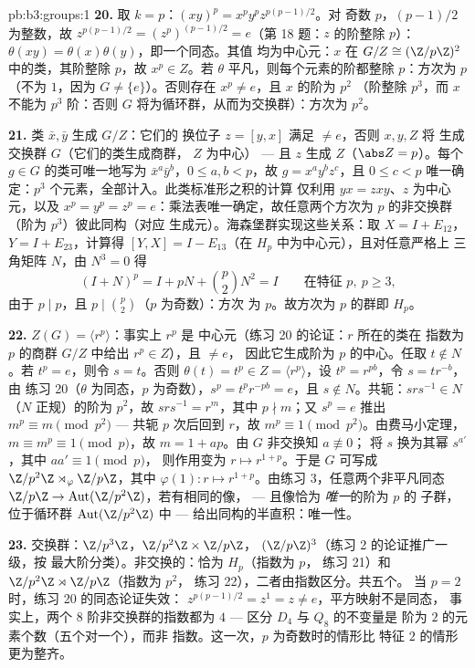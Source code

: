 \begin{solution}{pb:b3:groups:1}
\textbf{20.} 取 $k = p$：$(xy)^p = x^py^pz^{p(p-1)/2}$。对
奇数 $p$，$(p-1)/2$ 为整数，故 $z^{p(p-1)/2} =
(z^p)^{(p-1)/2} = e$（第 18 题：$z$ 的阶整除 $p$）：
$\theta(xy) = \theta(x)\theta(y)$，即一个同态。其值
均为中心元：$x$ 在 $G/Z \cong (\Z/p\Z)^2$ 中的类，其阶整除
$p$，故 $x^p \in Z$。若 $\theta$ 平凡，则每个元素的阶都整除
$p$：方次为 $p$（不为 $1$，因为 $G \neq
\{e\}$）。否则存在 $x^p \neq e$，且 $x$ 的阶为 $p^2$
（阶整除 $p^3$，而 $x$ 不能为 $p^3$ 阶：否则 $G$
将为循环群，从而为交换群）：方次为 $p^2$。

\textbf{21.} 类 $\bar x, \bar y$ 生成 $G/Z$：它们的
换位子 $z = [y, x]$ 满足 $\neq e$，否则 $x, y, Z$ 将
生成交换群 $G$（它们的类生成商群，
$Z$ 为中心） --- 且 $z$ 生成 $Z$（$\abs Z = p$）。每个
$g \in G$ 的类可唯一地写为 $\bar x^a\bar y^b$，$0 \leq a, b <
p$，故 $g = x^ay^bz^c$，且 $0 \leq c < p$ 唯一确定：$p^3$
个元素，全部计入。此类标准形之积的计算
仅利用 $yx = zxy$、$z$ 为中心元，以及 $x^p = y^p =
z^p = e$：乘法表唯一确定，故任意两个方次为 $p$
的非交换群（阶为 $p^3$）彼此同构（对应
生成元）。海森堡群实现这些关系：取
$X = I + E_{12}$，$Y = I + E_{23}$，计算得 $[Y, X] = I -
E_{13}$（在 $H_p$ 中为中心元），且对任意严格上
三角矩阵 $N$，由 $N^3 = 0$ 得
\[
(I + N)^p = I + pN + \binom p2N^2 = I
\qquad\text{在特征 } p,\ p \geq 3,
\]
由于 $p \mid p$，且 $p \mid \binom p2$（$p$ 为奇数）：方次
为 $p$。故方次为 $p$ 的群即 $H_p$。

\textbf{22.} $Z(G) = \langle r^p\rangle$：事实上 $r^p$ 是
中心元（练习 20 的论证：$r$ 所在的类在
指数为 $p$ 的商群 $G/Z$ 中给出 $r^p \in Z$），且 $\neq e$，
因此它生成阶为 $p$ 的中心。任取 $t \notin N$。若
$t^p = e$，则令 $s = t$。否则 $\theta(t) = t^p \in Z =
\langle r^p\rangle$，设 $t^p = r^{pb}$，令 $s = tr^{-b}$，由
练习 20（$\theta$ 为同态，$p$ 为奇数），$s^p =
t^pr^{-pb} = e$，且 $s \notin N$。共轭：$srs^{-1} \in
N$（$N$ 正规）的阶为 $p^2$，故 $srs^{-1} = r^m$，其中 $p
\nmid m$；又 $s^p = e$ 推出 $m^p \equiv m \pmod{p^2}$ ---
共轭 $p$ 次后回到 $r$，故 $m^p \equiv 1 \pmod
{p^2}$。由费马小定理，$m \equiv m^p \equiv 1 \pmod p$，故 $m = 1 +
ap$。由 $G$ 非交换知 $a \not\equiv 0$；
将 $s$ 换为其幂 $s^{a'}$，其中 $aa' \equiv 1 \pmod p$，
则作用变为 $r \mapsto r^{1+p}$。于是 $G$ 可写成
$\Z/p^2\Z\rtimes_\varphi\Z/p\Z$，其中 $\varphi(1)\colon r
\mapsto r^{1+p}$。由练习 3，任意两个非平凡同态
$\Z/p\Z \to \operatorname{Aut}(\Z/p^2\Z)$，若有相同的像，
--- 且像恰为 \emph{唯一}的阶为 $p$ 的
子群，位于循环群 $\operatorname{Aut}(\Z/p^2\Z)$ 中 ---
给出同构的半直积：唯一性。

\textbf{23.} 交换群：$\Z/p^3\Z$，$\Z/p^2\Z\times\Z/p\Z$，
$(\Z/p\Z)^3$（练习 2 的论证推广一级，按
最大阶分类）。非交换的：恰为 $H_p$（指数为 $p$，
练习 21）和 $\Z/p^2\Z\rtimes\Z/p\Z$（指数为 $p^2$，
练习 22），二者由指数区分。共五个。
当 $p = 2$ 时，练习 20 的同态论证失效：
$z^{p(p-1)/2} = z^{1} = z \neq e$，平方映射不是同态，
事实上，两个 $8$ 阶非交换群的指数都为
$4$ --- 区分 $D_4$ 与 $Q_8$ 的不变量是
阶为 $2$ 的元素个数（五个对一个），而非
指数。这一次，$p$ 为奇数时的情形比
特征 $2$ 的情形更为整齐。


\end{solution}

